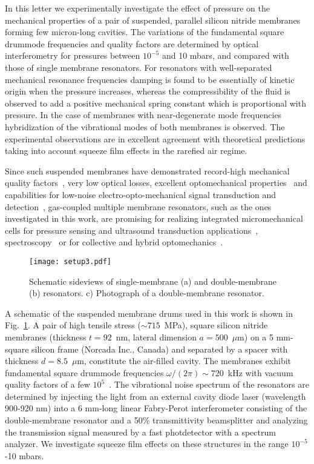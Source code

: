 \documentclass[pra,twocolumn,superscriptaddress,notitlepage]{revtex4-1}
\begin{document}
In this letter we experimentally investigate the effect of pressure on the mechanical properties of a pair of suspended, parallel silicon nitride membranes forming few micron-long cavities. The variations of the fundamental square drummode frequencies and quality factors are determined by optical interferometry for pressures between $10^{-5}$ and 10 mbars, and compared with those of  single membrane resonators. For resonators with well-separated mechanical resonance frequencies damping is found to be essentially of kinetic origin when the pressure increases, whereas the compressibility of the fluid is observed to add a positive mechanical spring constant which is proportional with pressure. In the case of membranes with near-degenerate mode frequencies hybridization of the vibrational modes of both membranes is observed. The experimental observations are in excellent agreement with theoretical predictions taking into account squeeze film effects in the rarefied air regime.

 Since such suspended membranes have demonstrated record-high mechanical quality factors~\cite{Tsaturyan2017}, very low optical losses, excellent optomechanical properties~\cite{Thompson2008} and capabilities for low-noise electro-opto-mechanical signal transduction and detection~\cite{Bagci2014,Andrews2014,Fink2016}, gas-coupled multiple membrane resonators, such as the ones investigated in this work, are promising for realizing integrated micromechanical cells for pressure sensing and ultrasound transduction applications~\cite{Leinders2015}, spectroscopy~\cite{Jensen2016} or for collective and hybrid optomechanics~\cite{Xuereb2012,Xuereb2014,Xuereb2015,Dantan2014,Moeller2017}.


\begin{figure}
\texttt{[image: setup3.pdf]}
\caption{Schematic sideviews of single-membrane (a) and double-membrane (b) resonators. c) Photograph of a double-membrane resonator.}
\label{fig1}
\end{figure}

A schematic of the suspended membrane drums used in this work is shown in Fig.~\ref{fig1}. A pair of high tensile stress ($\sim715$~MPa), square silicon nitride membranes (thickness $t=92$~nm, lateral dimension $a=500$~$\mu$m) on a 5 mm-square silicon frame (Norcada Inc., Canada) and separated by a spacer with thickness $d=8.5$~$\mu$m, constitute the air-filled cavity. The membranes exhibit fundamental square drummode frequencies $\omega/(2\pi)\sim 720$~kHz with vacuum quality factors of a few $10^5$~\cite{Nair2017}. The vibrational noise spectrum of the resonators are determined by injecting the light from an external cavity diode laser (wavelength 900-920 nm) into a 6 mm-long linear Fabry-Perot interferometer consisting of the double-membrane resonator and a 50\% transmittivity beamsplitter and analyzing the transmission signal measured by a fast photdetector with a spectrum analyzer. We investigate squeeze film effects on these structures in the range $10^{-5}$-10 mbars. 
\end{document}
